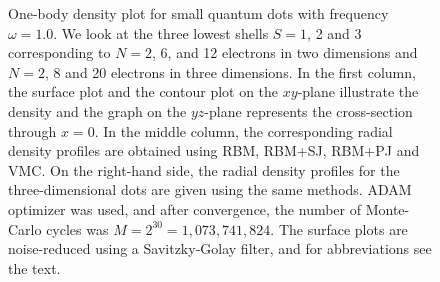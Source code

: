 \begin{figure}[H]
	\hspace{0.1cm}
	\hspace{-0.0cm}
	\hspace{-0.5cm}
	
	\caption{One-body density plot for small quantum dots with frequency $\omega=1.0$. We look at the three lowest shells $S=1$, 2 and 3 corresponding to $N=2$, 6, and 12 electrons in two dimensions and $N=2$, 8 and 20 electrons in three dimensions. In the first column, the surface plot and the contour plot on the $xy$-plane illustrate the density and the graph on the $yz$-plane represents the cross-section through $x=0$. In the middle column, the corresponding radial density profiles are obtained using RBM, RBM+SJ, RBM+PJ and VMC. On the right-hand side, the radial density profiles for the three-dimensional dots are given using the same methods. ADAM optimizer was used, and after convergence, the number of Monte-Carlo cycles was $M=2^{30}=1,073,741,824$. The surface plots are noise-reduced using a Savitzky-Golay filter, and for abbreviations see the text.}
	\label{fig:OB_interaction_23D}
\end{figure}
